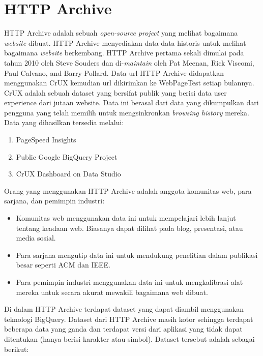 \section{HTTP Archive \cite{httparchiveAbout}}
HTTP Archive adalah sebuah \textit{open-source project} yang melihat bagaimana \textit{website} dibuat. HTTP Archive menyediakan data-data historis untuk melihat bagaimana \textit{website} berkembang. HTTP Archive pertama sekali dimulai pada tahun 2010 oleh Steve Souders dan di-\textit{maintain} oleh Pat Meenan, Rick Viscomi, Paul Calvano, and Barry Pollard. Data url HTTP Archive didapatkan menggunakan CrUX kemudian url dikirimkan ke WebPageTest setiap bulannya. 
CrUX adalah sebuah dataset yang bersifat publik yang berisi data user experience dari jutaan website. Data ini berasal dari data yang dikumpulkan dari pengguna yang telah memilih untuk mengsinkronkan \textit{browsing history} mereka. Data yang dihasilkan tersedia melalui:
\begin{enumerate}
	\item PageSpeed Insights
	\item Public Google BigQuery Project
	\item CrUX Dashboard on Data Studio 
\end{enumerate} 
Orang yang menggunakan HTTP Archive adalah anggota komunitas web, para sarjana, dan pemimpin industri:
\begin{itemize}
    \item Komunitas web menggunakan data ini untuk mempelajari lebih lanjut tentang keadaan web. Biasanya dapat dilihat pada blog, presentasi, atau media sosial. 
    \item Para sarjana mengutip data ini untuk mendukung penelitian dalam publikasi besar seperti ACM dan IEEE.
    \item Para pemimpin industri menggunakan data ini untuk mengkalibrasi alat mereka untuk secara akurat mewakili bagaimana web dibuat.
\end{itemize}
Di dalam HTTP Archive terdapat dataset yang dapat diambil menggunakan teknologi BigQuery. Dataset dari HTTP Archive masih kotor sehingga terdapat beberapa data yang ganda dan terdapat versi dari aplikasi yang tidak dapat ditentukan (hanya berisi karakter atau simbol). Dataset tersebut adalah sebagai berikut:
